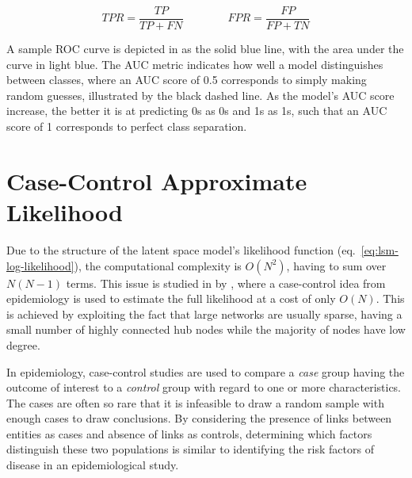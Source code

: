     \begin{equation}\label{eq:eval-tpr-fpr}
        TPR = \frac{TP}{TP + FN} \qquad\qquad FPR = \frac{FP}{FP + TN}
    \end{equation}
    
    A sample ROC curve is depicted in  as the solid blue line, with the area under the curve in light blue.
    The AUC metric indicates how well a model distinguishes between classes, where an AUC score of 0.5 corresponds to simply making random guesses, illustrated by the black dashed line. As the model's AUC score increase, the better it is at predicting 0s as 0s and 1s as 1s, such that an AUC score of 1 corresponds to perfect class separation.
    

\section{Case-Control Approximate Likelihood}

    Due to the structure of the latent space model's likelihood function (eq.~\ref{eq:lsm-log-likelihood}), the computational complexity is $O(N^2)$, having to sum over $N(N-1)$ terms. This issue is studied in \cite{raftery2012fast} by \citeauthor{raftery2012fast}, where a case-control idea from epidemiology is used to estimate the full likelihood at a cost of only $O(N)$. This is achieved by exploiting the fact that large networks are usually sparse, having a small number of highly connected hub nodes while the majority of nodes have low degree.
    
    In epidemiology, case-control studies are used to compare a \emph{case} group having the outcome of interest to a \emph{control} group with regard to one or more characteristics. The cases are often so rare that it is infeasible to draw a random sample with enough cases to draw conclusions.
    By considering the presence of links between entities as cases and absence of links as controls, determining which factors distinguish these two populations is similar to identifying the risk factors of disease in an epidemiological study.
    
